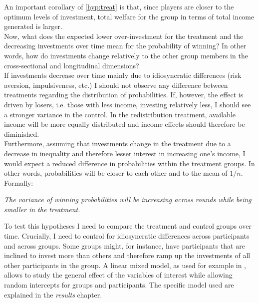     An important corollary of \cref{hyp:treat} is that, since players are closer to the optimum levels of investment, total welfare for the group in terms of total income generated is larger.\\
    
    Now, what does the expected lower over-investment for the treatment and the decreasing investments over time mean for the probability of winning? In other words, how do investments change relatively to the other group members in the cross-sectional and longitudinal dimensions?\\
    
    If investments decrease over time mainly due to idiosyncratic differences (risk aversion, impulsiveness, etc.) I should not observe any difference between treatments regarding the distribution of probabilities. If, however, the effect is driven by losers, i.e. those with less income, investing relatively less, I should see a stronger variance in the control. In the redistribution treatment, available income will be more equally distributed and income effects should therefore be diminished.\\
    
    Furthermore, assuming that investments change in the treatment due to a decrease in inequality and therefore lesser interest in increasing one's income, I would expect a reduced difference in probabilities within the treatment groups. In other words, probabilities will be closer to each other and to the mean of $1/n$. Formally:
    
    \begin{hyp}\label{hyp:wins}
    \textit{The variance of winning probabilities will be increasing across rounds while being smaller in the treatment.}
    \end{hyp}
          
    To test this hypotheses I need to compare the treatment and control groups over time. Crucially, I need to control for idiosyncratic differences across participants and across groups. Some groups might, for instance, have participants that are inclined to invest more than others and therefore ramp up the investments of all other participants in the group. A linear mixed model, as used for example in \cite{szaszi2018}, allows to study the general effect of the variables of interest while allowing random intercepts for groups and participants. The specific model used are explained in the \textit{results} chapter.\\ 
    
